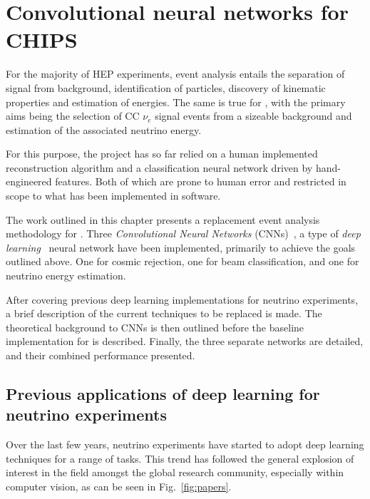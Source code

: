 \chapter{Convolutional neural networks for CHIPS} %
\label{chap:cnn} %

For the majority of HEP experiments, event analysis entails the separation of signal from
background, identification of particles, discovery of kinematic properties and estimation of
energies. The same is true for \chips, with the primary aims being the selection of CC $\nu_{e}$
signal events from a sizeable background and estimation of the associated neutrino energy.

For this purpose, the \chips project has so far relied on a human implemented reconstruction
algorithm and a classification neural network driven by hand-engineered features. Both of which
are prone to human error and restricted in scope to what has been implemented in software.

The work outlined in this chapter presents a replacement event analysis methodology for \chips.
Three \emph{Convolutional Neural Networks} (CNNs)~\cite{fukushima1982}, a type of \emph{deep
    learning}~\cite{goodfellow2016} neural network have been implemented, primarily to achieve the
goals outlined above. One for cosmic rejection, one for beam classification, and one for neutrino
energy estimation.

After covering previous deep learning implementations for neutrino experiments, a brief
description of the current techniques to be replaced is made. The theoretical background to CNNs
is then outlined before the baseline implementation for \chips is described. Finally, the three
separate networks are detailed, and their combined performance presented.

\section{Previous applications of deep learning for neutrino experiments} %
\label{sec:cnn_previous} %

Over the last few years, neutrino experiments have started to adopt deep learning techniques for a
range of tasks. This trend has followed the general explosion of interest in the field amongst the
global research community, especially within computer vision, as can be seen in
Fig.~\ref{fig:papers}.


